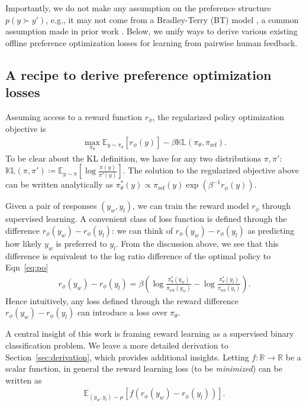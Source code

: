 Importantly, we do not make any assumption on the preference structure $p(y\succ y')$, e.g., it may not come from a Bradley-Terry (BT) model \citep{bradley1952rank}, a common assumption made in prior work \citep{rafailov2023direct}. 
Below, we unify ways to derive various existing offline preference optimization losses for learning from pairwise human feedback.

\subsection{A recipe to derive preference optimization losses}

Assuming access to a reward function $r_\phi$, the regularized policy optimization objective \citep{ouyang2022training} is
\begin{align}
    \max_{\pi_\theta} \mathbb{E}_{y\sim \pi_\theta}\left[r_\phi(y)\right] - \beta \mathbb{KL}\left(\pi_\theta,\pi_\text{ref}\right).\label{eq:po}
\end{align}
To be clear about the KL definition, we have for any two distributions $\pi,\pi'$: $\mathbb{KL}\left(\pi,\pi'\right) \coloneqq \mathbb{E}_{y\sim \pi}\left[\log \frac{\pi(y)}{\pi'(y)}\right]$. The solution to the regularized objective above can be written analytically as $\pi_\theta^\ast(y)\propto \pi_\text{ref}(y)\exp\left(\beta^{-1}r_\phi(y)\right)$.

Given a pair of responses $(y_w,y_l)$, we can train the reward model $r_\phi$ through supervised learning. A convenient class of loss function is defined through the difference $r_\phi(y_w)-r_\phi(y_l)$: we can think of $r_\phi(y_w)-r_\phi(y_l)$ as predicting how likely $y_w$ is preferred to $y_l$. From the discussion above, we see that this difference is equivalent to the log ratio difference of the optimal policy to Eqn~\eqref{eq:po}
\begin{align}
    r_\phi(y_w) - r_\phi(y_l) = \beta \left( \log \frac{\pi_\theta^\ast(y_w)}{\pi_\text{ref}(y_w)} - \log \frac{\pi_\theta^\ast(y_l)}{\pi_\text{ref}(y_l)}\right).\label{eq:reward-logit-equivalence}
\end{align}
Hence intuitively, any loss defined through the reward difference $r_\phi(y_w) - r_\phi(y_l)$
can introduce a loss over $\pi_\theta$. 

A central insight of this work is framing reward learning as a supervised binary classification problem. We leave a more detailed derivation to Section~\ref{sec:derivation}, which provides additional insights. Letting $f:\mathbb{R}\rightarrow\mathbb{R}$ be a scalar function, in general the reward learning loss (to be \emph{minimized}) can be written as
\begin{align}
    \mathbb{E}_{(y_w,y_l)\sim \mu}\left[f\left(r_\phi(y_w)-r_\phi(y_l)\right)\right].\label{eq:rm}
\end{align}

